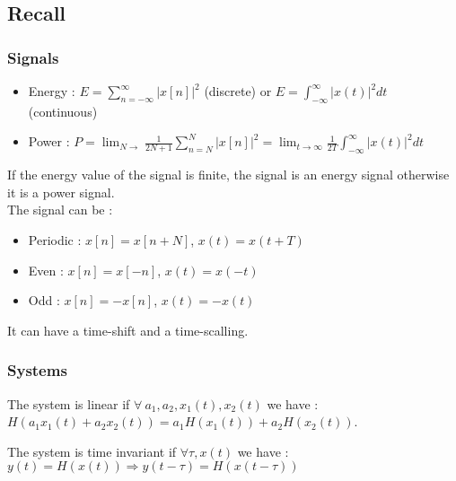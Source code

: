\documentclass[../main.tex]{subfiles}
\begin{document}
\localtableofcontents

\subsection{Recall}
\subsubsection{Signals}
\begin{itemize}
    \item Energy : $E = \sum_{n=-\infty}^\infty \lvert x[n] \rvert^2$ (discrete) or $E = \int_{-\infty}^\infty \lvert x(t) \rvert^2dt$ (continuous)\\
    \item Power : $P = \lim_{N\rightarrow} \frac{1}{2N+1} \sum_{n=N}^N \lvert x[n] \rvert^2 = \lim_{t \rightarrow \infty} \frac{1}{2T} \int_{-\infty}^\infty \lvert x(t) \rvert^2dt$\\
\end{itemize}
\warning If the energy value of the signal is finite, the signal is an energy signal otherwise it is a power signal.\\

The signal can be : \begin{itemize}
    \item Periodic : $x[n] = x[n+N]$, $x(t) = x(t+T)$\\
    \item Even : $x[n] = x[-n]$, $x(t) = x(-t)$\\
    \item Odd : $x[n] = -x[n]$, $x(t) = -x(t)$\\
\end{itemize}
It can have a time-shift and a time-scalling.\\

\subsubsection{Systems}
\begin{theorem}
    The system is linear if $\forall \: a_1, a_2, x_1(t), x_2(t)$ we have : $H(a_1 x_1(t) + a_2 x_2(t)) = a_1 H(x_1(t)) + a_2 H(x_2(t))$.
\end{theorem}

 \begin{theorem}
     The system is time invariant if $\forall \tau, x(t)$ we have : $y(t) = H(x(t)) \Rightarrow y(t-\tau) = H(x(t-\tau))$
 \end{theorem}
\end{document}
